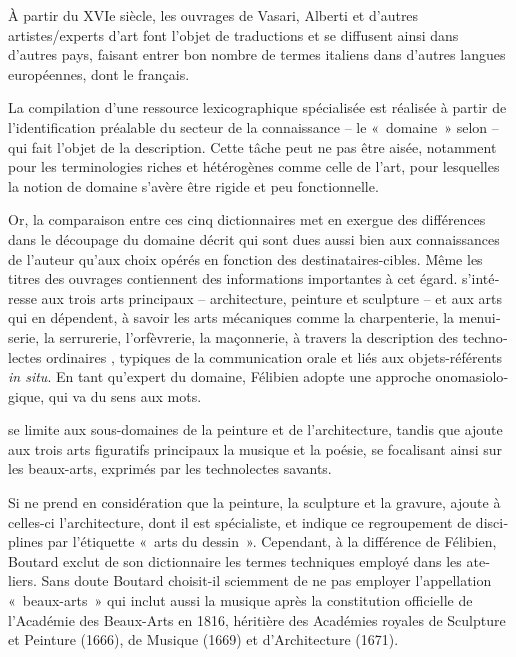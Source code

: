 \documentclass[output=paper,colorlinks,citecolor=brown,arabicfont,chinesefont,booklanguage=french]{langscibook}
\begin{document}
\begin{otherlanguage}{french}
À partir du XVIe siècle, les ouvrages de Vasari, Alberti et d’autres artistes/experts d’art font l’objet de traductions et se diffusent ainsi dans d’autres pays, faisant entrer bon nombre de termes italiens dans d’autres langues européennes, dont le français.  

La compilation d’une ressource lexicographique spécialisée est réalisée à partir de l’identification préalable du secteur de la connaissance – le «~domaine~» selon \citet{Wuster1981} – qui fait l’objet de la description. Cette tâche peut ne pas être aisée, notamment pour les terminologies riches et hétérogènes comme celle de l’art, pour lesquelles la notion de domaine s’avère être rigide et peu fonctionnelle.

Or, la comparaison entre ces cinq dictionnaires met en exergue des différences dans le découpage du domaine décrit qui sont dues aussi bien aux connaissances de l’auteur qu’aux choix opérés en fonction des destinataires-cibles. Même les titres des ouvrages contiennent des informations importantes à cet égard. \citet{Felibien1676} s’intéresse aux trois arts principaux – architecture, peinture et sculpture – et aux arts qui en dépendent, à savoir les arts mécaniques comme la charpenterie, la menuiserie, la serrurerie, l’orfèvrerie, la maçonnerie, à travers la description des technolectes ordinaires \citep{Messaoudi2013}, typiques de la communication orale et liés aux objets-référents \emph{in situ}. En tant qu’expert du domaine, Félibien adopte une approche onomasiologique, qui va du sens aux mots.

\citet{Marsy1746} se limite aux sous-domaines de la peinture et de l’architecture, tandis que \citet{Lacombe1752} ajoute aux trois arts figuratifs principaux la musique et la poésie, se focalisant ainsi sur les beaux-arts, exprimés par les technolectes savants.

Si \citet{Pernety1757} ne prend en considération que la peinture, la sculpture et la gravure, \citet{Boutard1826} ajoute à celles-ci l’architecture, dont il est spécialiste, et indique ce regroupement de disciplines par l’étiquette «~arts du dessin~». Cependant, à la différence de Félibien, Boutard exclut de son dictionnaire les termes techniques employé dans les ateliers. Sans doute Boutard choisit-il sciemment de ne pas employer l’appellation «~beaux-arts~» qui inclut aussi la musique après la constitution officielle de l’Académie des Beaux-Arts en 1816, héritière des Académies royales de Sculpture et Peinture (1666), de Musique (1669) et d’Architecture (1671).


\end{otherlanguage}
\end{document}
